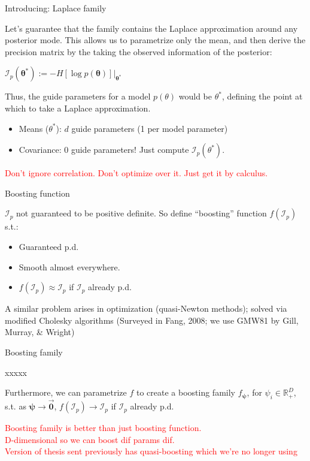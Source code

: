 \documentclass[
  ignorenonframetext,
]{beamer}
\providecommand{\tightlist}{%
  \setlength{\itemsep}{0pt}\setlength{\parskip}{0pt}}
\begin{document}
\begin{frame}{Introducing: Laplace family}
\protect\hypertarget{introducing-laplace-family}{}

Let's guarantee that the family contains the Laplace approximation
around any posterior mode. This allows us to parametrize only the mean,
and then derive the precision matrix by the taking the observed
information of the posterior:

\(\mathcal{I}_p\left(\bm{\theta}^*\right) := -H\left[\log p(\bm{\theta})\right]\bigg\rvert_{\bm{\theta}^*}\)

Thus, the guide parameters for a model \(p(\theta)\) would be
\(\theta^*\), defining the point at which to take a Laplace
approximation.

\begin{itemize}
\tightlist
\item
  Means (\(\theta^*\)): \(d\) guide parameters (1 per model parameter)
\item
  Covariance: 0 guide parameters! Just compute
  \(\mathcal{I}_p(\theta^*)\).
\end{itemize}

\textcolor{red}{{\scriptsize Don't ignore correlation. Don't optimize over it. Just get it by calculus.}}

\end{frame}

\begin{frame}{Boosting function}
\protect\hypertarget{boosting-function}{}

\(\mathcal{I}_p\) not guaranteed to be positive definite. So define
``boosting'' function \(f(\mathcal{I}_p)\) s.t.:

\begin{itemize}
\tightlist
\item
  Guaranteed p.d.
\item
  Smooth almost everywhere.
\item
  \(f(\mathcal{I}_p)\approx\mathcal{I}_p\) if \(\mathcal{I}_p\) already
  p.d.
\end{itemize}

A similar problem arises in optimization (quasi-Newton methods); solved
via modified Cholesky algorithms (Surveyed in Fang, 2008; we use GMW81
by Gill, Murray, \& Wright)

\end{frame}

\begin{frame}{Boosting family}
\protect\hypertarget{boosting-family}{}

xxxxx

Furthermore, we can parametrize \(f\) to create a boosting family
\(f_{\bm{\psi}}\), for \(\psi_i\in\mathbb{R}^D_+\), s.t. as
\(\bm{\psi}\rightarrow\vec{\bm{0}}\),
\(f(\mathcal{I}_p)\rightarrow\mathcal{I}_p\) if \(\mathcal{I}_p\)
already p.d.

\textcolor{red}{{\scriptsize Boosting family is better than just boosting function.\\D-dimensional so we can boost dif params dif.\\Version of thesis sent previously has quasi-boosting which we’re no longer using}}

\end{frame}
\end{document}
